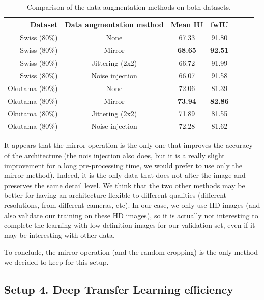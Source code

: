 \begin{table}[htbp]
  \centering
  
  \begin{tabular}{rcccccc}
  \rowcolor{gray!50}
  \toprule
  \textbf{Dataset} & \textbf{Data augmentation method} & \textbf{Mean IU} & \textbf{fwIU} \\
  \midrule
  Swiss (80\%)		&	None				&	67.33	& 	91.80 \\
  Swiss (80\%)		&	Mirror			&	\textbf{68.65}   & 	\textbf{92.51} \\
  Swiss (80\%)		&	Jittering (2x2)	&	66.72   & 	91.99 \\
  Swiss (80\%)		&	Noise injection	&	66.07   & 	91.58 \\
  \midrule
  Okutama (80\%)	&	None				&	72.06   & 	81.39 \\
  Okutama (80\%)	&	Mirror			&	\textbf{73.94}   & 	\textbf{82.86} \\
  Okutama (80\%)	&	Jittering (2x2)	&	71.89			& 	81.55 \\
  Okutama (80\%)	&	Noise injection	&	72.28		& 	81.62 \\
  \bottomrule
  \end{tabular}%
  
  \caption{Comparison of the data augmentation methods on both datasets.}
\end{table}%

It appears that the mirror operation is the only one that improves the accuracy of the architecture (the nois injection also does, but it is a really slight improvement for a long pre-processing time, we would prefer to use only the mirror method). Indeed, it is the only data that does not alter the image and preserves the same detail level. We think that the two other methods may be better for having an architecture flexible to different qualities (different resolutions, from different cameras, etc). In our case, we only use HD images (and also validate our training on these HD images), so it is actually not interesting to complete the learning with low-definition images for our validation set, even if it may be interesting with other data.

To conclude, the mirror operation (and the random cropping) is the only method we decided to keep for this setup.


\subsection*{Setup 4. Deep Transfer Learning efficiency}
